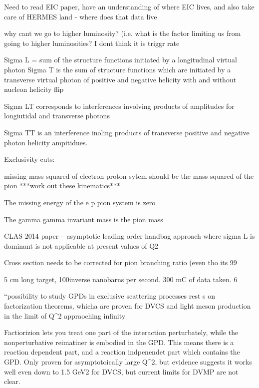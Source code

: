         
        
Need to read EIC paper, have an understanding of where EIC lives, and also take care of HERMES land - where does that data live

why cant we go to higher luminosity? (i.e. what is the factor limiting us from going to higher luminosities? I dont think it is triggr rate




Sigma L = sum of the structure functions initiated by a longitudinal virtual photon
Sigma T is the sum of structure functions which are initiated by a transverse virtual photon of positive and negative helicity with and without nucleon helicity flip

Sigma LT corresponds to interferences involving products of amplitudes for longiutidal and transverse photons

Sigma TT is an interference inoling products of transverse positive and negative photon helicity ampitidues.


Exclusivity cuts: 

missing mass squared of electron-proton sytem should be the mass squared of the pion ***work out these kinematics***

The missing energy of the e p pion system is zero

The gamma gamma invariant mass is the pion mass
  
            
            
            
            CLAS 2014 paper – asymptotic leading order handbag approach where sigma L is dominant is not applicable at present values of Q2

Cross section needs to be corrected for pion branching ratio (even tho its 99%

            
            
            5 cm long target, 100inverse nanobarns per second. 300 mC of data taken. 6%
            
            
            
“possibility to study GPDs in exclusive scattering processes rest s on factorization theorems, whicha are proven for DVCS and light meson production in the limit of Q^2 appraoching infinity

Factiorizion lets you treat one part of the interaction perturbately, while the nonperturbative reimatiner is embodied in the GPD. This means there is a reaction dependent part, and a reaction indpenendet part which contains the GPD. Only proven for asymptotoically large Q^2, but evidence suggests it works well even down to 1.5 GeV2 for DVCS, but current limits for DVMP are not clear. 

